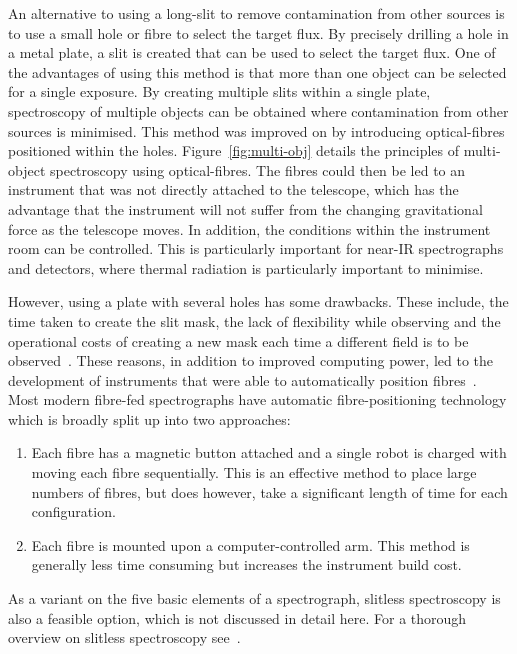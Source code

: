 An alternative to using a long-slit to remove contamination from other sources is to use a small hole or fibre to select the target flux.
By precisely drilling a hole in a metal plate, a slit is created that can be used to select the target flux.
One of the advantages of using this method is that more than one object can be selected for a single exposure.
By creating multiple slits within a single plate, spectroscopy of multiple objects can be obtained where contamination from other sources is minimised.
This method was improved on by introducing optical-fibres positioned within the holes.
Figure~\ref{fig:multi-obj} details the principles of multi-object spectroscopy using optical-fibres.
The fibres could then be led to an instrument that was not directly attached to the telescope, which has the advantage that the instrument will not suffer from the changing gravitational force as the telescope moves.
In addition, the conditions within the instrument room can be controlled.
This is particularly important for near-IR spectrographs and detectors, where thermal radiation is particularly important to minimise.

However, using a plate with several holes has some drawbacks.
These include, the time taken to create the slit mask, the lack of flexibility while observing and the operational costs of creating a new mask each time a different field is to be observed~\citep{1986SPIE..627..118P}.
These reasons, in addition to improved computing power, led to the development of instruments that were able to automatically position fibres~\citep{1982SPIE..331..289T}.
Most modern fibre-fed spectrographs have automatic fibre-positioning technology which is broadly split up into two approaches:

\begin{enumerate}
    \item Each fibre has a magnetic button attached and a single robot is charged with moving each fibre sequentially.
    This is an effective method to place large numbers of fibres, but does however, take a significant length of time for each configuration.
    \item Each fibre is mounted upon a computer-controlled arm.
    This method is generally less time consuming but increases the instrument build cost.
\end{enumerate}

As a variant on the five basic elements of a spectrograph, slitless spectroscopy is also a feasible option, which is not discussed in detail here.
For a thorough overview on slitless spectroscopy see~\citet{2014PhDT.........C}.

